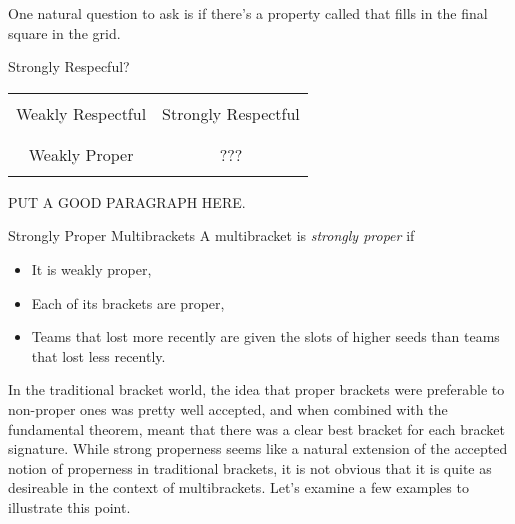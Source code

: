 {    One natural question to ask is if there's a property called that fills in the final square in the grid.

    \begin{figg}{Strongly Respecful?}{}
        \begin{center}
            \begin{tabular}{ | c | c |}
            \hline
            & \\
            Weakly Respectful & Strongly Respectful\\
            & \\
            \hline
            & \\
            Weakly Proper & ??? \\
            & \\
            \hline
            \end{tabular}
        \end{center}
    \end{figg}


    PUT A GOOD PARAGRAPH HERE.

    \begin{definition}{Strongly Proper Multibrackets}{}
        A multibracket is \textit{strongly proper} if
        \begin{itemize}
            \item It is weakly proper,
            \item Each of its brackets are proper,
            \item Teams that lost more recently are given the slots of higher seeds than teams that lost less recently.
        \end{itemize}
    \end{definition}

    In the traditional bracket world, the idea that proper brackets were preferable to non-proper ones was pretty well accepted, and when combined with the fundamental theorem, meant that there was a clear best bracket for each bracket signature. While strong properness seems like a natural extension of the accepted notion of properness in traditional brackets, it is not obvious that it is quite as desireable in the context of multibrackets. Let's examine a few examples to illustrate this point.
    
}
